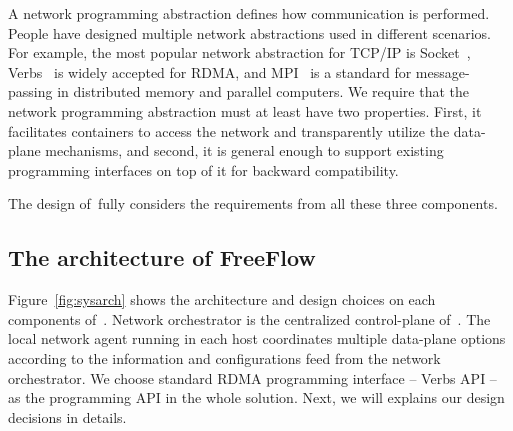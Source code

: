 A network programming abstraction defines how communication is performed.
People have designed multiple network abstractions used in different scenarios.
For example, the most popular network abstraction for TCP/IP is Socket~\cite{?},
Verbs~\cite{?} is widely accepted for RDMA, and MPI~\cite{?} is a standard for
message-passing in distributed memory and parallel computers. We require that
the network programming abstraction must at least have two
properties. First, it facilitates containers to access the network and 
transparently utilize the data-plane mechanisms, and second, it is general 
enough to support existing programming interfaces on top of it for backward 
compatibility.

The design of~\sysname fully considers the requirements from all these three
components.

\subsection{The architecture of FreeFlow}

Figure~\ref{fig:sysarch} shows the architecture and design choices on each 
components of~\sysname. Network orchestrator is the centralized control-plane
of~\sysname. The local network agent running in each host coordinates
multiple data-plane options according to the information and configurations feed
from the network orchestrator. We choose standard RDMA programming interface --
Verbs API -- as the programming API in the whole solution. Next, we will explains
our design decisions in details. 




